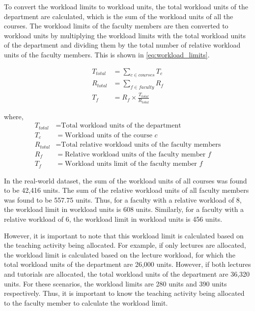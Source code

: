 To convert the workload limits to workload units, the total workload units of the department are calculated, which is the sum of the workload units of all the courses. The workload limits of the faculty members are then converted to workload units by multiplying the workload limits with the total workload units of the department and dividing them by the total number of relative workload units of the faculty members. This is shown in \autoref{eq:workload_limits}.

\begin{equation}
  \label{eq:workload_limits}
  \begin{aligned}
    T_{total} & = \sum_{c \in courses} T_c               \\
    R_{total} & = \sum_{f \in faculty} R_f               \\
    T_f       & = R_f \times \frac{T_{total}}{R_{total}}
  \end{aligned}
\end{equation}

where,
\begin{align*}
  T_{total} & = \text{Total workload units of the department}               \\
  T_c       & = \text{Workload units of the course } c                      \\
  R_{total} & = \text{Total relative workload units of the faculty members} \\
  R_f       & = \text{Relative workload units of the faculty member } f     \\
  T_f       & = \text{Workload units limit of the faculty member } f
\end{align*}

In the real-world dataset, the sum of the workload units of all courses was found to be 42,416 units. The sum of the relative workload units of all faculty members was found to be 557.75 units. Thus, for a faculty with a relative workload of 8, the workload limit in workload units is 608 units. Similarly, for a faculty with a relative workload of 6, the workload limit in workload units is 456 units.

However, it is important to note that this workload limit is calculated based on the teaching activity being allocated. For example, if only lectures are allocated, the workload limit is calculated based on the lecture workload, for which the total workload units of the department are 26,000 units. However, if both lectures and tutorials are allocated, the total workload units of the department are 36,320 units. For these scenarios, the workload limits are 280 units and 390 units respectively. Thus, it is important to know the teaching activity being allocated to the faculty member to calculate the workload limit.

